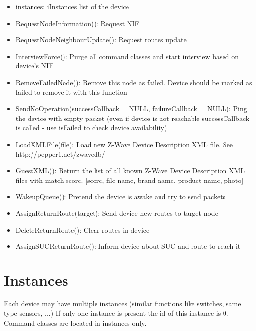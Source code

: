 \begin {itemize}
\begin {itemize}
\item instances: iInstances list of the device
\item RequestNodeInformation(): Request NIF
\item RequestNodeNeighbourUpdate(): Request routes update
\item InterviewForce(): Purge all command classes and start interview based on device's NIF
\item RemoveFailedNode(): Remove this node as failed. Device should be marked as failed to remove it with this function.
\item SendNoOperation(successCallback = NULL, failureCallback = NULL): Ping the device with empty packet (even if device is not reachable successCallback is called - use isFailed to check device availability)
\item LoadXMLFile(file): Load new Z-Wave Device Description XML file. See http://pepper1.net/zwavedb/
\item GuestXML(): Return the list of all known Z-Wave Device Description XML files with match score. [score, file name, brand name, product name, photo]
\item WakeupQueue(): Pretend the device is awake and try to send packets
\item AssignReturnRoute(target): Send device new routes to target node
\item DeleteReturnRoute(): Clear routes in device
\item AssignSUCReturnRoute(): Inform device about SUC and route to reach it
\end {itemize}
\end {itemize}

\section{Instances}

Each device may have multiple instances (similar functions like switches, same type 
sensors, ...) If only one instance is present the id of this instance is 0. Command 
classes are located in instances only.


